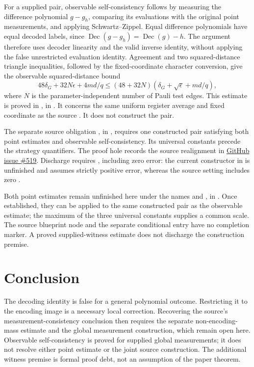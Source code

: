 \documentclass[11pt]{article}
\renewcommand{\ghissue}[1]{%
  \href{https://github.com/Dengnifer/MIPStarRE-A/issues/#1}{GitHub issue \##1}}
\begin{document}
For a supplied pair, observable self-consistency follows by measuring the
difference polynomial $g-g_h$, comparing its evaluations with the original
point measurements, and applying Schwartz--Zippel. Equal difference
polynomials have equal decoded labels, since
$\operatorname{Dec}(g-g_h)=\operatorname{Dec}(g)-h$.
The argument therefore uses decoder linearity and the valid inverse identity,
without applying the false unrestricted evaluation identity.
Agreement and two squared-distance triangle inequalities, followed by the
fixed-coordinate character conversion, give the observable squared-distance
bound
\[
 48\delta_G+32N\epsilon+4md/q
 \leq (48+32N)(\delta_G+\sqrt\epsilon+md/q),
\]
where $N$ is the parameter-independent number of Pauli test edges.
This estimate is proved in
, in
. It concerns the same uniform
register average and fixed coordinate as the source
\cite[lines~1476--1605]{Ji2020MIPStar}. It does not construct the pair.

The separate source obligation
, in
, requires one constructed
pair satisfying both point estimates and observable self-consistency. Its
universal constants precede the strategy quantifiers. The proof hole records
the source realignment in \ghissue{519}. Discharge requires
, including zero error: the current constructor
in  is unfinished and assumes strictly
positive error, whereas the source setting includes zero
\cite[lines~197--199]{Ji2020MIPStar}.

Both point estimates remain unfinished here under the names
 and
, in
. Once established,
they can be applied to the same constructed pair as the observable estimate;
the maximum of the three universal constants supplies a common scale.
The source blueprint node and the separate conditional entry have no
completion marker. A proved supplied-witness estimate does not discharge
the construction premise.

\section{Conclusion}

The decoding identity is false for a general polynomial outcome.  Restricting
it to the encoding image is a necessary local correction.  Recovering the
source's measurement-consistency conclusion then requires the separate
non-encoding-mass estimate and the global measurement construction, which
remain open here. Observable self-consistency is proved for supplied global
measurements; it does not resolve either point estimate or the joint source
construction. The additional witness premise is formal proof debt, not an
assumption of the paper theorem.



\end{document}
